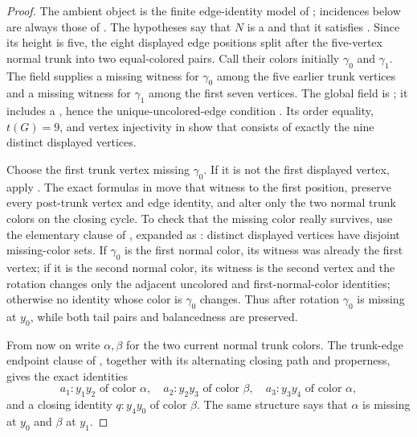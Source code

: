 \begin{proof}
The ambient object is the finite edge-identity model of
; incidences below are always those of
.  The hypotheses say that $N$ is a
 and that it satisfies
.  Since its height is five, the
eight displayed edge positions split after the five-vertex normal trunk
into two equal-colored pairs.  Call their colors initially $\gamma_0$
and $\gamma_1$.  The  field supplies a missing
witness for $\gamma_0$ among the five earlier trunk vertices and a
missing witness for $\gamma_1$ among the first seven vertices.  The
global field is ; it includes a
, hence the unique-uncolored-edge condition
.  Its order equality, $t(G)=9$, and vertex
injectivity in  show that
 consists of exactly the nine distinct
displayed vertices.

Choose the first trunk vertex missing $\gamma_0$.  If it is not the
first displayed vertex, apply .
The exact formulas in  move that witness to the
first position, preserve every post-trunk vertex and edge identity, and
alter only the two normal trunk colors on the closing cycle.  To check
that the missing color really survives, use the elementary clause of
, expanded as
: distinct displayed vertices have
disjoint missing-color sets.  If $\gamma_0$ is the first normal color,
its witness was already the first vertex; if it is the second normal
color, its witness is the second vertex and the rotation changes only
the adjacent uncolored and first-normal-color identities; otherwise no
identity whose color is $\gamma_0$ changes.  Thus after rotation
$\gamma_0$ is missing at $y_0$, while both tail pairs and balancedness
are preserved.

From now on write $\alpha,\beta$ for the two current normal trunk colors.
The trunk-edge endpoint clause of
, together with its alternating closing
path and properness, gives the exact identities
\[
 a_1:y_1y_2\text{ of color }\alpha,\quad
 a_2:y_2y_3\text{ of color }\beta,\quad
 a_3:y_3y_4\text{ of color }\alpha,
\]
and a closing identity $q:y_4y_0$ of color $\beta$.  The same structure
says that $\alpha$ is missing at $y_0$ and $\beta$ at $y_1$.


\end{proof}
